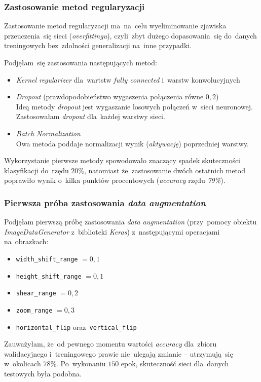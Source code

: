 \documentclass[11pt, a4paper]{article}
\begin{document}
\subsubsection{Zastosowanie metod regularyzacji}
Zastosowanie metod regularyzacji ma~na~celu wyeliminowanie zjawiska przeuczenia~się sieci (\textit{overfittingu}), czyli~zbyt dużego dopasowania~się do~danych treningowych bez~zdolności generalizacji na~inne przypadki.

Podjęłam~się zastosowania następujących metod:
\begin{itemize}
    \item \textit{Kernel regularizer} dla~wartstw \textit{fully connected} i~warstw konwolucyjnych 
    \item \textit{Dropout} (prawdopodobieństwo wygaszenia połączenia równe $0,2$) \\
    Ideą metody \textit{dropout} jest wygaszanie losowych połączeń w~sieci neuronowej. Zastosowałam \textit{dropout} dla~każdej warstwy sieci.
    \item \textit{Batch Normalization} \\
    Owa metoda poddaje normalizacji wynik (\textit{aktywację}) poprzedniej warstwy.
\end{itemize}
Wykorzystanie pierwsze metody spowodowało znaczący spadek skuteczności klasyfikacji do~rzędu $20\%$,
natomiast że~zastosowanie dwóch ostatnich metod poprawiło wynik o~kilka punktów procentowych (\textit{accuracy} rzędu \textit{79\%}).


\subsubsection{Pierwsza próba zastosowania \textit{data augmentation}}
Podjęłam pierwszą próbę zastosowania \textit{data augmentation} (przy~pomocy obiektu \textit{ImageDataGenerator} z~biblioteki \textit{Keras}) z~następującymi operacjami na~obrazkach:
\begin{itemize}
    \item \texttt{width\_shift\_range} $ = 0,1$
    \item \texttt{height\_shift\_range} $= 0,1$
    \item \texttt{shear\_range} $ = 0,2 $
    \item \texttt{zoom\_range} $ = 0,3$
    \item \texttt{horizontal\_flip} oraz~\texttt{vertical\_flip}
\end{itemize}

Zauważyłam, że~od pewnego momentu wartości \textit{accuracy} dla~zbioru walidacyjnego i~treningowego prawie nie~ulegają zmianie -- utrzymują~się w~okolicach $78\%$.
Po~wykonaniu $150$ epok, skuteczność sieci dla~danych testowych była podobna.
\end{document}
